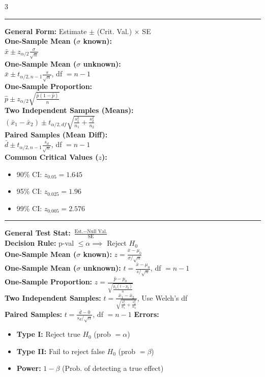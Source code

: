 \documentclass[8pt, letterpaper]{article}
\newcommand{\sectionhead}[1]{%
    \vspace{1.2mm}{\large\bfseries#1}\vspace{0.2mm}\hrule\vspace{0.8mm}%
}
\begin{document}
\begin{multicols}{3}
\columnbreak

\sectionhead{Confidence Intervals}
\textbf{General Form:} Estimate $\pm$ (Crit. Val.) $\times$ SE \\
\textbf{One-Sample Mean ($\sigma$ known):} \\
$\bar{x} \pm z_{\alpha/2} \frac{\sigma}{\sqrt{n}}$ \\
\textbf{One-Sample Mean ($\sigma$ unknown):} \\
$\bar{x} \pm t_{\alpha/2,n-1} \frac{s}{\sqrt{n}}$, df $= n-1$ \\
\textbf{One-Sample Proportion:} \\
$\hat{p} \pm z_{\alpha/2} \sqrt{\frac{\hat{p}(1-\hat{p})}{n}}$ \\
\textbf{Two Independent Samples (Means):} \\
$(\bar{x}_1 - \bar{x}_2) \pm t_{\alpha/2,df} \sqrt{\frac{s_1^2}{n_1} + \frac{s_2^2}{n_2}}$ \\
\textbf{Paired Samples (Mean Diff):} \\
$\bar{d} \pm t_{\alpha/2,n-1} \frac{s_d}{\sqrt{n}}$, df $= n-1$ \\
\textbf{Common Critical Values ($z$):}
\begin{itemize}
    \item 90\% CI: $z_{0.05} = 1.645$
    \item 95\% CI: $z_{0.025} = 1.96$
    \item 99\% CI: $z_{0.005} = 2.576$
\end{itemize}

\sectionhead{Hypothesis Testing}
\textbf{General Test Stat:} $\frac{\text{Est.} - \text{Null Val.}}{\text{SE}}$ \\
\textbf{Decision Rule:} p-val $\le \alpha \implies$ Reject $H_0$ \\
\textbf{One-Sample Mean ($\sigma$ known):} $z = \frac{\bar{x} - \mu_0}{\sigma/\sqrt{n}}$ \\
\textbf{One-Sample Mean ($\sigma$ unknown):} $t = \frac{\bar{x} - \mu_0}{s/\sqrt{n}}$, df $= n-1$ \\
\textbf{One-Sample Proportion:} $z = \frac{\hat{p} - p_0}{\sqrt{\frac{p_0(1-p_0)}{n}}}$ \\
\textbf{Two Independent Samples:} $t = \frac{\bar{x}_1 - \bar{x}_2}{\sqrt{\frac{s_1^2}{n_1} + \frac{s_2^2}{n_2}}}$, Use Welch's df \\
\textbf{Paired Samples:} $t = \frac{\bar{d} - 0}{s_d/\sqrt{n}}$, df $= n-1$
\textbf{Errors:}
\begin{itemize}
    \item \textbf{Type I:} Reject true $H_0$ (prob $= \alpha$)
    \item \textbf{Type II:} Fail to reject false $H_0$ (prob $= \beta$)
    \item \textbf{Power:} $1 - \beta$ (Prob. of detecting a true effect)
\end{itemize}

\end{multicols}
\end{document}

